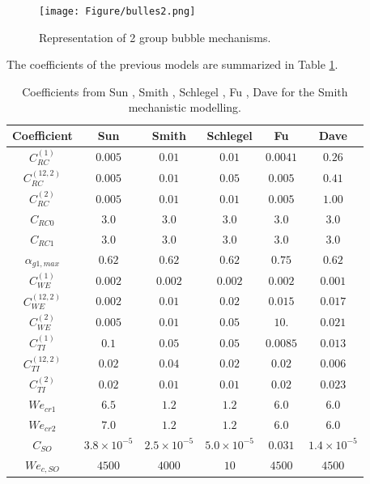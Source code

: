\begin{figure}[!ht]
    \centering
    \texttt{[image: Figure/bulles2.png]}
    \caption{Representation of 2 group bubble mechanisms.}
    \label{bulles}
\end{figure}
The coefficients of the previous models are summarized in Table \ref{coeff2grp}.
\begin{table}[!ht]
\begin{center}
\begin{tabular}{c c c c c c }
\toprule
Coefficient & Sun \cite{SUN2} & Smith \cite{Smith1} & Schlegel \cite{Schlegel1} & Fu \cite{Fu2002} & Dave \cite{Dave2016a}\\
\midrule
\rowcolor[gray]{0.9} $C^{(1)}_{RC}$ & $0.005$ &$0.01$ & $0.01$ & $0.0041$ & $0.26$ \\
 $C^{(12,2)}_{RC}$ & $0.005$ & $0.01$ & $0.05$ & $0.005$ & $0.41$ \\
 \rowcolor[gray]{0.9} $C^{(2)}_{RC}$ & $0.005$ & $0.01$ & $0.01$ & $0.005$ & $1.00$ \\
 $C_{RC0}$ & $3.0$ & $3.0$ & $3.0$ & $3.0$ & $3.0$ \\
 \rowcolor[gray]{0.9} $C_{RC1}$ & $3.0$ & $3.0$ & $3.0$  & $3.0$ & $3.0$ \\
 $\alpha_{g1,max}$ & $0.62$ & $0.62$ & $0.62$& $0.75$ & $0.62$ \\
\rowcolor[gray]{0.9} $C^{(1)}_{WE}$ & $0.002$ & $0.002$ & $0.002$ & $0.002$ & $0.001$  \\
$C^{(12,2)}_{WE}$ & $0.002$ & $0.01$ & $0.02$ & $0.015$ & $0.017$\\
\rowcolor[gray]{0.9} $C^{(2)}_{WE}$ & $0.005$ & $0.01$ & $0.05$ & $10.$ & $0.021$  \\
$C^{(1)}_{TI}$ & $0.1$ & $0.05$ & $0.05$ & $0.0085$ & $0.013$  \\
\rowcolor[gray]{0.9} $C^{(12,2)}_{TI}$ & $0.02$ & $0.04$ & $0.02$ & $0.02$ & $0.006$  \\
$C^{(2)}_{TI}$ & $0.02$ & $0.01$ & $0.01$ & $0.02$ & $0.023$ \\
\rowcolor[gray]{0.9} $We_{cr1}$ & $6.5$ & $1.2$ & $1.2$ & $6.0$ & $6.0$  \\
$We_{cr2}$ & $7.0$ & $1.2$ & $ 1.2$ & $6.0$ & $6.0$  \\
\rowcolor[gray]{0.9} $C_{SO}$ & $3.8 \times 10^{-5}$ & $2.5 \times 10^{-5}$ & $5.0 \times 10^{-5}$ & $0.031$ & $1.4 \times 10^{-5}$ \\
$We_{c,SO}$ & $4500$ & $4000$ & $10$ & $4500$ & $4500$  \\  \bottomrule
\end{tabular}
\end{center}
\caption{Coefficients from Sun \cite{SUN2}, Smith \cite{Smith1}, Schlegel \cite{Schlegel1}, Fu \cite{Fu2002}, Dave \cite{Dave2016a} for the Smith mechanistic modelling.}
\label{coeff2grp}
\end{table}
